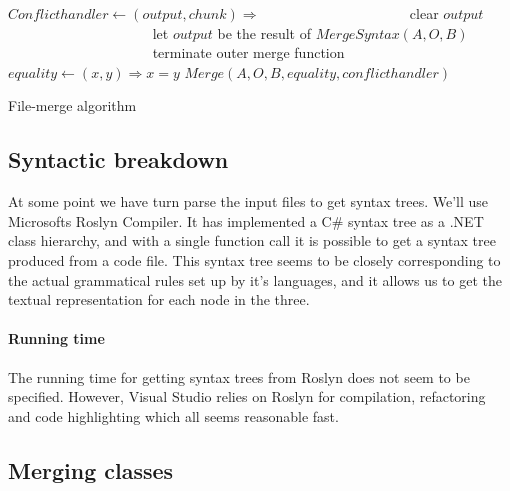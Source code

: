 \documentclass[11pt]{article}
\begin{document}
\begin{algorithm}
\begin{algorithmic}
   \State $Conflicthandler \gets (output, chunk) \Rightarrow$
      \State ~~~~~~~~~~~~~~~~~~~~ clear $output$
      \State ~~~~~~~~~~~~~~~~~~~~ let $output$ be the result of $MergeSyntax(A, O, B)$
      \State ~~~~~~~~~~~~~~~~~~~~ terminate outer merge function
	\State $equality \gets (x, y) \Rightarrow x = y$
	\State \Return $Merge(A, O, B, equality, conflicthandler)$
\EndFunction
\end{algorithmic}
\caption{File-merge algorithm}
  \label{Mainmerge}
\end{algorithm}

\subsection{Syntactic breakdown}
\label{SyntaxBreakDown}
At some point we have turn parse the input files to get syntax trees. We'll use Microsofts Roslyn Compiler. It has implemented a C\# syntax tree as a .NET class hierarchy, and with a single function call it is possible to get a syntax tree produced from a code file. This syntax tree seems to be closely corresponding to the actual grammatical rules set up by it's languages, and it allows us to get the textual representation for each node in the three.


\paragraph{Running time} The running time for getting syntax trees from Roslyn does not seem to be specified. However, Visual Studio relies on Roslyn for compilation, refactoring and code highlighting which all seems reasonable fast.

\subsection{Merging classes}
\label{mergingclasses}
\label{MergingClasses}
\end{document}
